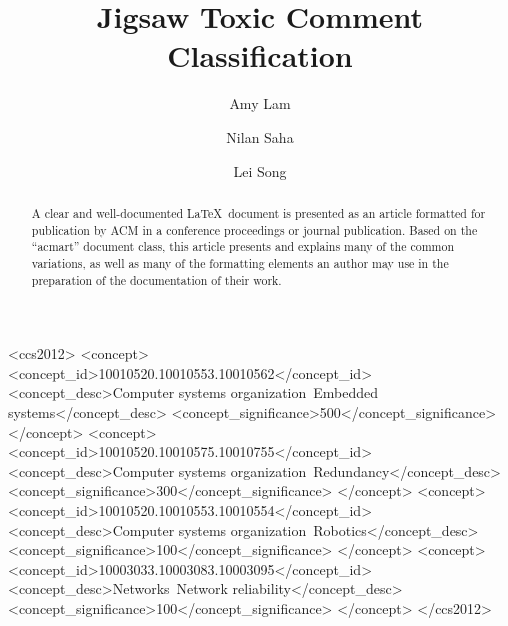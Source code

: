 \documentclass[sigconf]{acmart}
\begin{document}
%
\title{Jigsaw Toxic Comment Classification}

%

\author{Amy Lam}
\email{}

\author{Nilan Saha}
\email{}

\author{Lei Song}
%
\renewcommand{\shortauthors}{}

%
\begin{abstract}
A clear and well-documented \LaTeX\ document is presented as an article formatted for publication by ACM in 
a conference proceedings or journal publication. Based on the ``acmart'' document class, this article presents
and explains many of the common variations, as well as many of the formatting elements
an author may use in the preparation of the documentation of their work.
\end{abstract}

%
%
\begin{CCSXML}
<ccs2012>
 <concept>
  <concept_id>10010520.10010553.10010562</concept_id>
  <concept_desc>Computer systems organization~Embedded systems</concept_desc>
  <concept_significance>500</concept_significance>
 </concept>
 <concept>
  <concept_id>10010520.10010575.10010755</concept_id>
  <concept_desc>Computer systems organization~Redundancy</concept_desc>
  <concept_significance>300</concept_significance>
 </concept>
 <concept>
  <concept_id>10010520.10010553.10010554</concept_id>
  <concept_desc>Computer systems organization~Robotics</concept_desc>
  <concept_significance>100</concept_significance>
 </concept>
 <concept>
  <concept_id>10003033.10003083.10003095</concept_id>
  <concept_desc>Networks~Network reliability</concept_desc>
  <concept_significance>100</concept_significance>
 </concept>
</ccs2012>
\end{CCSXML}
\end{document}
